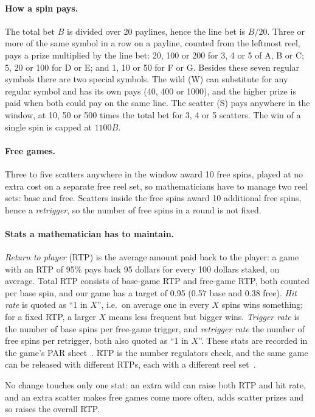 \paragraph{How a spin pays.}
The total bet $B$ is divided over 20 paylines, hence the line bet is $B/20$. Three or more of the same symbol in a row on a payline, counted from the leftmost reel, pays a prize multiplied by the line bet: 20, 100 or 200 for 3, 4 or 5 of A, B or C; 5, 20 or 100 for D or E; and 1, 10 or 50 for F or G. Besides these seven regular symbols there are two special symbols. The wild (W) can substitute for any regular symbol and has its own pays (40, 400 or 1000), and the higher prize is paid when both could pay on the same line. The scatter (S) pays anywhere in the window, at 10, 50 or 500 times the total bet for 3, 4 or 5 scatters. The win of a single spin is capped at $1100B$.

\paragraph{Free games.}
Three to five scatters anywhere in the window award 10 free spins, played at no extra cost on a separate free reel set, so mathematicians have to manage two reel sets: base and free. Scatters inside the free spins award 10 additional free spins, hence a \emph{retrigger}, so the number of free spins in a round is not fixed.

\paragraph{Stats a mathematician has to maintain.}
\emph{Return to player} (RTP) is the average amount paid back to the player: a game with an RTP of 95\% pays back 95 dollars for every 100 dollars staked, on average. Total RTP consists of base-game RTP and free-game RTP, both counted per base spin, and our game has a target of 0.95 (0.57 base and 0.38 free). \emph{Hit rate} is quoted as ``1 in $X$'', i.e.\ on average one in every $X$ spins wins something; for a fixed RTP, a larger $X$ means less frequent but bigger wins. \emph{Trigger rate} is the number of base spins per free-game trigger, and \emph{retrigger rate} the number of free spins per retrigger, both also quoted as ``1 in $X$''. These stats are recorded in the game's PAR sheet~\cite{harrigan2009par}. RTP is the number regulators check, and the same game can be released with different RTPs, each with a different reel set~\cite{harrigan2010tight}.

No change touches only one stat: an extra wild can raise both RTP and hit rate, and an extra scatter makes free games come more often, adds scatter prizes and so raises the overall RTP.
